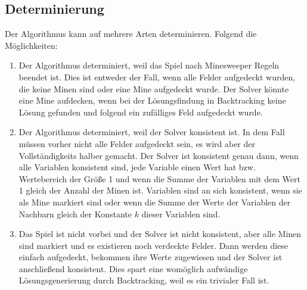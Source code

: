 \subsection{Determinierung}

Der Algorithmus kann auf mehrere Arten determinieren. Folgend die Möglichkeiten:
\begin{enumerate}
    \item Der Algorithmus determiniert, weil das Spiel nach Minesweeper Regeln beendet ist. Dies ist entweder der Fall, wenn alle Felder aufgedeckt
    wurden, die keine Minen sind oder eine Mine aufgedeckt wurde. Der Solver könnte eine Mine aufdecken, wenn bei der Lösungsfindung in Backtracking keine Lösung
    gefunden und folgend ein zufälliges Feld aufgedeckt wurde.
    \item Der Algorithmus determiniert, weil der Solver konsistent ist. In dem Fall müssen vorher nicht alle Felder aufgedeckt sein, es wird
    aber der Vollständigkeits halber gemacht. Der Solver ist konsistent genau dann, wenn alle Variablen konsistent sind, 
    jede Variable einen Wert hat bzw. Wertebereich der Größe 1 und wenn die Summe der Variablen mit dem Wert 1 gleich der Anzahl der Minen ist.
    Variablen sind an sich konsistent, wenn sie als Mine markiert sind oder wenn die Summe der Werte der Variablen der Nachbarn gleich der
    Konstante $k$ dieser Variablen sind.
    \item Das Spiel ist nicht vorbei und der Solver ist nicht konsistent, aber alle Minen sind markiert und es existieren noch verdeckte Felder.
    Dann werden diese einfach aufgedeckt, bekommen ihre Werte zugewiesen und der Solver ist anschließend konsistent. Dies spart eine womöglich
    aufwändige Lösungsgenerierung durch Backtracking, weil es ein trivialer Fall ist.
\end{enumerate}
